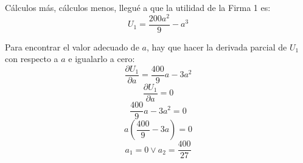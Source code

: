 \documentclass{article}
\begin{document}
                Cálculos más, cálculos menos, llegué a que la utilidad de la Firma 1 es:
                \[U_{1} = \frac{200a^{2}}{9}-a^{3}\]

                Para encontrar el valor adecuado de $a$, hay que hacer la derivada parcial de $U_{1}$ con respecto a $a$ e igualarlo a cero:
                \[\frac{\partial U_{1}}{\partial a} = \frac{400}{9}a-3a^{2}\]
                \[\frac{\partial U_{1}}{\partial a} = 0\]
                \[\frac{400}{9}a-3a^{2} = 0\]
                \[a(\frac{400}{9}-3a) = 0\]
                \[a_{1} = 0 \vee a_{2} = \frac{400}{27}\]
        
\end{document}
